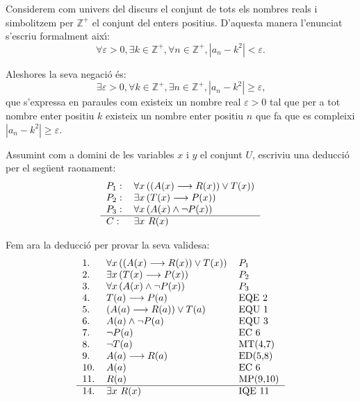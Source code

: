 \begin{solucio}
Considerem com univers del discurs el conjunt de tots els nombres reals i
simbolitzem per $\mathbb{Z}^{+}$ el conjunt del enters positius. D'aquesta
manera l'enunciat s'escriu formalment aix\'{\i}:
\[
\forall\varepsilon>0,\exists k\in\mathbb{Z}^{+},\forall n\in\mathbb{Z}%
^{+},\left\vert a_{n}-k^{2}\right\vert <\varepsilon\text{.}%
\]


Aleshores la seva negaci\'{o} \'{e}s:%
\[
\exists\varepsilon>0,\forall k\in\mathbb{Z}^{+},\exists n\in\mathbb{Z}%
^{+},\left\vert a_{n}-k^{2}\right\vert \geq\varepsilon\text{,}%
\]
que s'expressa en paraules com existeix un nombre real $\varepsilon>0$ tal que
per a tot nombre enter positiu $k$ existeix un nombre enter positiu $n$ que fa
que es compleixi $\left\vert a_{n}-k^{2}\right\vert \geq\varepsilon$.
\end{solucio}

\begin{exer}
Assumint com a domini de les variables $x$ i $y$ el conjunt $U$, escriviu una
deducci\'{o} per el seg\"{u}ent raonament:%
\[%
\begin{tabular}
[c]{ll}%
$P_{1}:$ & $\forall x\left(  \left(  A(x)\longrightarrow R(x)\right)  \vee
T(x)\right)  $\\
$P_{2}:$ & $\exists x\left(  T(x)\longrightarrow P(x)\right)  $\\
$P_{3}:$ & $\forall x\left(  A(x)\wedge\lnot P(x)\right)  $\\\hline
$C:$ & $\exists x\ R(x)$%
\end{tabular}
\]

\end{exer}

\begin{solucio}
Fem ara la deducci\'{o} per provar la seva validesa:%
\[%
\begin{tabular}
[c]{lll}%
1. & $\forall x\left(  \left(  A(x)\longrightarrow R(x)\right)  \vee
T(x)\right)  $ & $P_{1}$\\
2. & $\exists x\left(  T(x)\longrightarrow P(x)\right)  $ & $P_{2}$\\
3. & $\forall x\left(  A(x)\wedge\lnot P(x)\right)  $ & $P_{3}$\\
4. & $T(a)\longrightarrow P(a)$ & EQE 2\\
5. & $\left(  A(a)\longrightarrow R(a)\right)  \vee T(a)$ & EQU 1\\
6. & $A(a)\wedge\lnot P(a)$ & EQU 3\\
7. & $\lnot P(a)$ & EC 6\\
8. & $\lnot T(a)$ & MT(4,7)\\
9. & $A(a)\longrightarrow R(a)$ & ED(5,8)\\
10. & $A(a)$ & EC 6\\
11. & $R(a)$ & MP(9,10)\\\hline
14. & $\exists x~R(x)$ & IQE 11
\end{tabular}
\]

\end{solucio}

